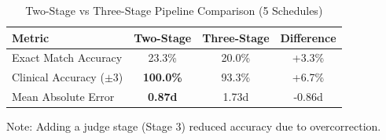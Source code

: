 
\begin{table}[htbp]
\centering
\caption{Two-Stage vs Three-Stage Pipeline Comparison (5 Schedules)}
\label{tab:two_vs_three_stage}
\begin{tabular}{lccc}
\toprule
\textbf{Metric} & \textbf{Two-Stage} & \textbf{Three-Stage} & \textbf{Difference} \\
\midrule
Exact Match Accuracy & 23.3\% & 20.0\% & +3.3\% \\
Clinical Accuracy ($\pm$3) & \textbf{100.0\%} & 93.3\% & +6.7\% \\
Mean Absolute Error & \textbf{0.87d} & 1.73d & -0.86d \\
\bottomrule
\end{tabular}
\begin{tablenotes}
\small
\item Note: Adding a judge stage (Stage 3) reduced accuracy due to overcorrection.
\end{tablenotes}
\end{table}

